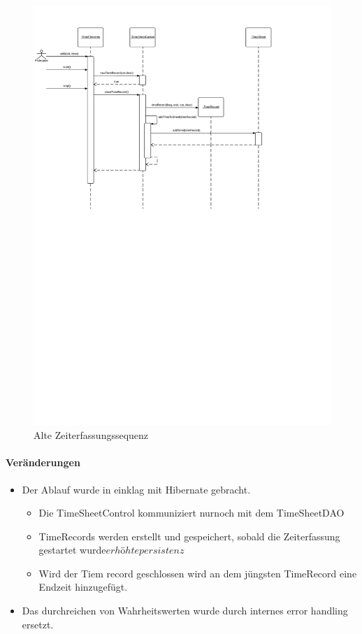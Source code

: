 \begin{figure}
  \centering
    \includegraphics[width=\linewidth]{new-Time-record.svg}
   \caption{Alte Zeiterfassungssequenz}
\end{figure}

\paragraph{Veränderungen}
\begin{itemize}
    \item Der Ablauf wurde in einklag mit Hibernate gebracht.
    \begin{itemize}
        \item Die TimeSheetControl kommuniziert nurnoch mit dem TimeSheetDAO
        \item TimeRecords werden erstellt und gespeichert, sobald die Zeiterfassung gestartet wurde\(erhöhte persistenz\)
        \item Wird der Tiem record geschlossen wird an dem jüngsten TimeRecord eine Endzeit hinzugefügt.
    \end{itemize}
    \item Das durchreichen von Wahrheitswerten wurde durch internes error handling ersetzt.
\end{itemize}

